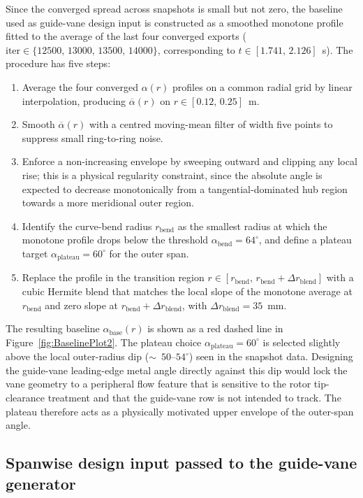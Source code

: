 Since the converged spread across snapshots is small but not zero, the
baseline used as guide-vane design input is constructed as a smoothed
monotone profile fitted to the average of the last four converged
exports
($\mathrm{iter}\in\{12500,\,13000,\,13500,\,14000\}$, corresponding to
$t\in[1.741,\,2.126]$~s). The procedure has five steps:
\begin{enumerate}
\item Average the four converged $\alpha(r)$ profiles on a common
      radial grid by linear interpolation, producing
      $\overline{\alpha}(r)$ on $r\in[0.12,\,0.25]$~m.
\item Smooth $\overline{\alpha}(r)$ with a centred moving-mean filter
      of width five points to suppress small ring-to-ring noise.
\item Enforce a non-increasing envelope by sweeping outward and
      clipping any local rise; this is a physical regularity
      constraint, since the absolute angle is expected to decrease
      monotonically from a tangential-dominated hub region towards a
      more meridional outer region.
\item Identify the curve-bend radius $r_{\mathrm{bend}}$ as the smallest
      radius at which the monotone profile drops below the threshold
      $\alpha_{\mathrm{bend}}=64^\circ$, and define a plateau target
      $\alpha_{\mathrm{plateau}}=60^\circ$ for the outer span.
\item Replace the profile in the transition region
      $r\in[r_{\mathrm{bend}},\,r_{\mathrm{bend}}+\Delta r_{\mathrm{blend}}]$
      with a cubic Hermite blend that matches the local slope of the
      monotone average at $r_{\mathrm{bend}}$ and zero slope at
      $r_{\mathrm{bend}}+\Delta r_{\mathrm{blend}}$, with
      $\Delta r_{\mathrm{blend}}=35$~mm.
\end{enumerate}
The resulting baseline $\alpha_{\mathrm{base}}(r)$ is shown as a red
dashed line in Figure~\ref{fig:BaselinePlot2}. The plateau choice
$\alpha_{\mathrm{plateau}}=60^\circ$ is selected slightly above the
local outer-radius dip ($\sim$~$50$--$54^\circ$) seen in the snapshot
data. Designing the guide-vane leading-edge metal angle directly
against this dip would lock the vane geometry to a peripheral flow
feature that is sensitive to the rotor tip-clearance treatment and that
the guide-vane row is not intended to track. The plateau therefore acts
as a physically motivated upper envelope of the outer-span angle.
 
\subsection{Spanwise design input passed to the guide-vane generator}
 
